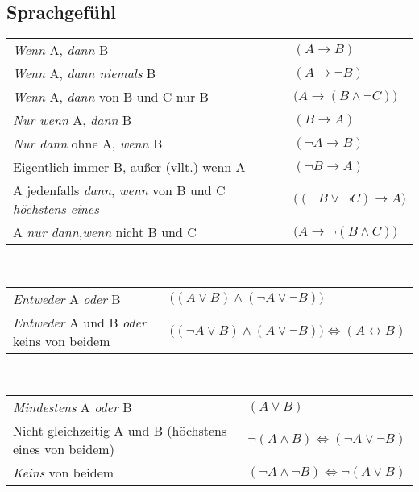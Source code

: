 \documentclass[a4paper,10pt,titlepage]{scrartcl}
\begin{document}
\subsection*{Sprachgefühl}
\label{sec:sprachgefuehl}
\noindent
\begin{tabular}{ll}
\emph{Wenn} A, \emph{dann} B							& $(A\to B)$\\
\emph{Wenn} A, \emph{dann niemals} B						& $(A\to \neg B)$\\
\emph{Wenn} A, \emph{dann} von B und C nur B					& $\bigl(A\to(B\wedge \neg C)\bigr)$\\
\emph{Nur wenn} A, \emph{dann} B						& $(B\to A)$\\
\emph{Nur dann} ohne A, \emph{wenn} B						& $(\neg A\to B)$\\
\parbox{9cm}{Eigentlich immer B, außer (vllt.) wenn A}				& $(\neg B\to A)$\\
A jedenfalls \emph{dann}, \emph{wenn} von B und C \emph{höchstens eines}	& $\bigl((\neg B\vee\neg C)\to A\bigr)$\\
A \emph{nur dann},\emph{wenn} nicht B und C					& $\bigl(A\to\neg(B\wedge C)\bigr)$\\
\end{tabular}
\smallskip\\
\noindent
\begin{tabular}{ll}
\parbox{9cm}{\emph{Entweder} A \emph{oder} B}					& $\bigl((A\vee B)\wedge(\neg A\vee\neg B)\bigr)$\\
\emph{Entweder} A und B \emph{oder} keins von beidem				& $\bigl((\neg A \vee B)\wedge(A\vee\neg B)\bigr) \Leftrightarrow (A\leftrightarrow B)$\\
\end{tabular}
\smallskip\\
\noindent
\begin{tabular}{ll}
\parbox{9cm}{\emph{Mindestens} A \emph{oder} B}					& $(A\vee B)$\\
Nicht gleichzeitig A und B (höchstens eines von beidem)				& $\neg(A\wedge B)\Leftrightarrow(\neg A\vee\neg B)$\\
\emph{Keins} von beidem								& $(\neg A\wedge\neg B)\Leftrightarrow\neg(A\vee B)$\\
\end{tabular}
\end{document}
